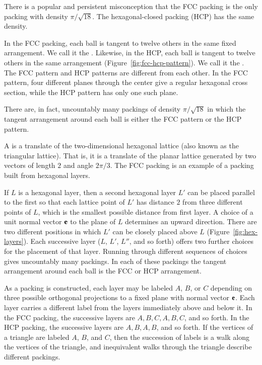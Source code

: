 There is a popular and persistent misconception that the FCC
 packing is the only packing with density $\pi/\sqrt{18}$.
The hexagonal-closed packing (HCP) has the same density.
%
%


In the FCC packing, each ball is tangent to twelve others in the same
fixed arrangement.  We call it the .  Likewise, in the HCP, each ball is tangent
to twelve others in the same arrangement
(Figure~\ref{fig:fcc-hcp-pattern}).  We call it the .  The FCC pattern and HCP patterns are
different from each other.  In the FCC pattern, four different planes
through the center give a regular hexagonal cross section, while the
HCP pattern has only one such plane.

\figSGIWBEN %

There are, in fact, uncountably many packings of density
$\pi/\sqrt{18}$ in which the tangent arrangement around each ball is
either the FCC pattern or the HCP pattern.

A  is a translate of the
two-dimensional hexagonal lattice (also known as the triangular
lattice). That is, it is a translate of the planar lattice generated
by two vectors of length $2$ and angle $2\pi/3$.  The FCC
 packing is an example of a packing built from hexagonal layers.

 If $L$ is a hexagonal layer, then a second hexagonal layer $L'$ can be
 placed parallel to the first so that each lattice point of $L'$ has
 distance $2$ from three different points of $L$,
 which is the smallest possible distance from first layer.  A choice
 of a unit normal vector ${\mathbf e}$ to the plane of $L$ determines an upward
 direction.  There are two different positions in which $L'$ can be
 closely placed above $L$
(Figure~\ref{fig:hex-layers}).  Each successive layer 
  ($L$, $L'$, $L''$, and so
 forth) offers two further choices  for the placement of
 that layer. Running through different 
 sequences of choices gives uncountably many packings.  In each of
 these packings the tangent arrangement around each ball is the FCC or HCP arrangement.

\figCCQCYWU %

As a packing is constructed, each layer may be labeled
$A$, $B$, or $C$ depending on three possible orthogonal projections to a fixed plane
with normal vector ${\mathbf e}$.
Each layer carries a different label from the layers immediately
above and below it.  In the FCC packing, the successive layers are
$A,B,C,A,B,C$, and so forth.  In the HCP packing, the successive layers are
$A,B,A,B$, and so forth.  If the vertices of a triangle are labeled $A$, $B$, and $C$,
then the succession of labels is a
walk along the vertices of the triangle, and inequivalent walks through the
triangle describe different packings.


